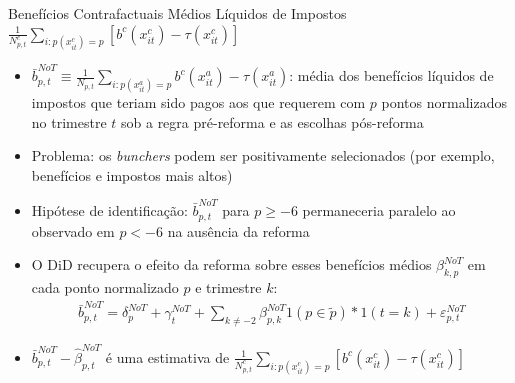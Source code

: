 \begin{frame}[label=netOfTaxBenefits]{Benefícios Contrafactuais Médios Líquidos de Impostos $\frac{1}{N_{p,t}^c}\sum_{i:p(x_{it}^c)=p}[b^c(x_{it}^c)-\tau(x^c_{it})]$}
    \begin{itemize}
        \item $\bar{b}^{NoT}_{p,t} \equiv \frac{1}{N_{p,t}} \sum_{i:p(x_{it}^a)=p}b^c(x_{it}^a)-\tau(x_{it}^a)$: média dos benefícios líquidos de impostos que teriam sido pagos aos que requerem com $p$ pontos normalizados no trimestre $t$ sob a regra pré-reforma e as escolhas pós-reforma
        \item Problema: os \textit{bunchers} podem ser positivamente selecionados (por exemplo, benefícios e impostos mais altos)
        \item Hipótese de identificação: $\bar{b}^{NoT}_{p,t}$ para $p\geq -6$ permaneceria paralelo ao observado em $p<-6$ na ausência da reforma
        \item O DiD recupera o efeito da reforma sobre esses benefícios médios $\beta^{NoT}_{k,p}$ em cada ponto normalizado $p$ e trimestre $k$:
         \begin{align*}
            \bar{b}^{NoT}_{p,t}=\delta_p^{NoT}+\gamma_t^{NoT} +\sum_{k\neq -2}\beta_{p,k}^{NoT} 1(p\in \tilde p)*1(t=k)+\varepsilon_{p,t}^{NoT}
        \end{align*}
        \item $\bar{b}^{NoT}_{p,t}-\hat \beta_{p,t}^{NoT}$ é uma estimativa de $\frac{1}{N_{p,t}^c}\sum_{i:p(x^c_{it})=p}[b^c(x^c_{it})-\tau(x^c_{it})]$
    \end{itemize}
\end{frame}

